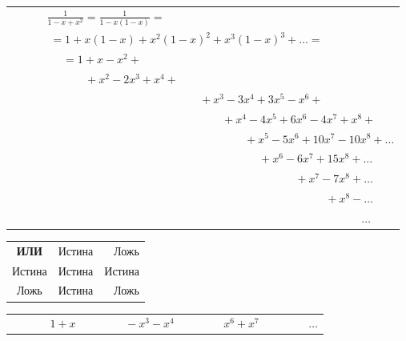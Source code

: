 \documentclass[a4paper,12pt]{article} %
\begin{document}
	\begin{table}[h!]
		\begin{tabulary}{\textwidth}{CCC}
			 \\
			 \\
			 & \\
			 & \\
			&  \\
			&  \\
			&  \\
			& & $\qquad \quad \; + x^6 - 6x^7 + 15x^8 + \dots$ \\
			& & $\; \quad \qquad \quad \; \qquad+ x^7 - 7x^8 + \dots$ \\
			& & $\qquad \qquad \qquad \quad \; \qquad + x^8 - \dots$ \\
			& & $\qquad \qquad \qquad \qquad \; \quad \qquad \quad \dots$ 
		\end{tabulary}
	
	\begin{tabular}{c||p{2cm}@{$\pm$\ }r|}
		\textbf{ИЛИ} & Истина & Ложь \\[2mm]
		\cline{2-3}
		Истина & Истина & Истина \\
		\cline{1-1}\cline{3-3}
		Ложь & Истина & Ложь\\ \cline{2-2}
	\end{tabular}
	
	\end{table}
\begin{table}[h!]
	\begin{tabulary}{\textwidth}{CCCC}
		$\; \qquad \; \; \; \; 1 + x$ & 
		$\; \qquad \; \; \; \; -x^3 -x^4$ & 
		$\; \qquad \; \; \; \; x^6 + x^7$ & 
		$\; \qquad \; \; \; \; \dots$
	\end{tabulary}
\end{table}

\end{document}
